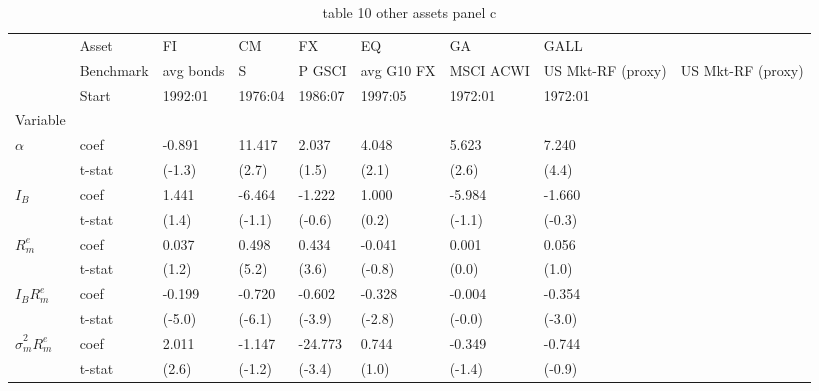 \begin{table}[htbp]
  \centering
  \caption{table 10 other assets panel c}
  \label{tab:table_10_other_assets_panel_c}
  \begin{tabular}{llllllll}
\toprule
 & Asset & FI & CM & FX & EQ & GA & GALL \\
 & Benchmark & avg bonds & S&P GSCI & avg G10 FX & MSCI ACWI & US Mkt-RF (proxy) & US Mkt-RF (proxy) \\
 & Start & 1992:01 & 1976:04 & 1986:07 & 1997:05 & 1972:01 & 1972:01 \\
Variable &  &  &  &  &  &  &  \\
\midrule
{} & coef & -0.891 & 11.417 & 2.037 & 4.048 & 5.623 & 7.240 \\
 & t-stat & (-1.3) & (2.7) & (1.5) & (2.1) & (2.6) & (4.4) \\
 & coef & 1.441 & -6.464 & -1.222 & 1.000 & -5.984 & -1.660 \\
 & t-stat & (1.4) & (-1.1) & (-0.6) & (0.2) & (-1.1) & (-0.3) \\
 & coef & 0.037 & 0.498 & 0.434 & -0.041 & 0.001 & 0.056 \\
 & t-stat & (1.2) & (5.2) & (3.6) & (-0.8) & (0.0) & (1.0) \\
 & coef & -0.199 & -0.720 & -0.602 & -0.328 & -0.004 & -0.354 \\
 & t-stat & (-5.0) & (-6.1) & (-3.9) & (-2.8) & (-0.0) & (-3.0) \\
 & coef & 2.011 & -1.147 & -24.773 & 0.744 & -0.349 & -0.744 \\
 & t-stat & (2.6) & (-1.2) & (-3.4) & (1.0) & (-1.4) & (-0.9) \\
\bottomrule
\end{tabular}

\end{table}
